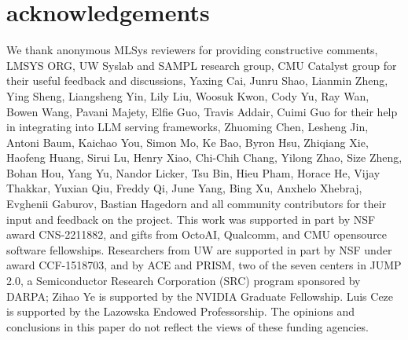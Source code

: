 \section{acknowledgements}
\label{sec:acknowledgements}

We thank anonymous MLSys reviewers for providing constructive comments, LMSYS ORG, UW Syslab and SAMPL research group, CMU Catalyst group for their useful feedback and discussions, Yaxing Cai, Junru Shao, Lianmin Zheng, Ying Sheng, Liangsheng Yin, Lily Liu, Woosuk Kwon, Cody Yu, Ray Wan, Bowen Wang, Pavani Majety, Elfie Guo, Travis Addair, Cuimi Guo for their help in integrating \sys into LLM serving frameworks, Zhuoming Chen, Lesheng Jin, Antoni Baum, Kaichao You, Simon Mo, Ke Bao, Byron Hsu, Zhiqiang Xie, Haofeng Huang, Sirui Lu, Henry Xiao, Chi-Chih Chang, Yilong Zhao, Size Zheng, Bohan Hou, Yang Yu, Nandor Licker, Tsu Bin, Hieu Pham, Horace He, Vijay Thakkar, Yuxian Qiu, Freddy Qi, June Yang, Bing Xu, Anxhelo Xhebraj, Evghenii Gaburov, Bastian Hagedorn and all community contributors for their input and feedback on the \sys project. This work was supported in part by NSF award CNS-2211882, and gifts from OctoAI, Qualcomm, and CMU opensource software fellowships.
Researchers from UW are supported in part by NSF under award CCF-1518703, and by ACE and PRISM, two of the seven centers in JUMP 2.0, a Semiconductor Research Corporation (SRC) program sponsored by DARPA;
Zihao Ye is supported by the NVIDIA Graduate Fellowship. Luis Ceze is supported by the Lazowska Endowed Professorship. The opinions and conclusions in this paper do not reflect the views of these funding agencies.

